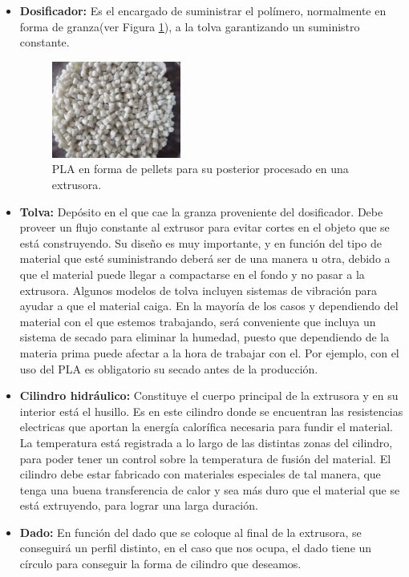 \begin{itemize}
    \item \textbf{Dosificador:} Es el encargado de suministrar el polímero, normalmente en forma de granza(ver Figura \ref{fig:Pellets_PLA}), a la tolva garantizando un suministro constante. 
     \begin{figure}[h!]
        \centering
        \includegraphics[width=0.4\textwidth]{images/PLA-Pellets.jpg}
        \caption[Pellets de PLA]{PLA en forma de pellets para su posterior procesado en una extrusora.}
        \label{fig:Pellets_PLA}
    \end{figure}
    \item \textbf{Tolva:} Depósito en el que cae la granza proveniente del dosificador. Debe proveer un flujo constante al extrusor para evitar cortes en el objeto que se está construyendo. Su diseño es muy importante, y en función del tipo de material que esté suministrando deberá ser de una manera u otra, debido a que el material puede llegar a compactarse en el fondo y no pasar a la extrusora. Algunos modelos de tolva incluyen sistemas de vibración para ayudar a que el material caiga. En la mayoría de los casos y dependiendo del material con el que estemos trabajando, será conveniente que incluya un sistema de secado para eliminar la humedad, puesto que dependiendo de la materia prima puede afectar a la hora de trabajar con el. Por ejemplo, con el uso del PLA es obligatorio su secado antes de la producción.
    \item \textbf{Cilindro hidráulico:} Constituye el cuerpo principal de la extrusora y en su interior está el husillo. Es en este cilindro donde se encuentran las resistencias electricas que aportan la energía calorífica necesaria para fundir el material. La temperatura está registrada a lo largo de las distintas zonas del cilindro, para poder tener un control sobre la temperatura de fusión del material. El cilindro debe estar fabricado con materiales especiales de tal manera, que tenga una buena transferencia de calor y sea más duro que el material que se está extruyendo, para lograr una larga duración.
    \item \textbf{Dado:} En función del dado que se coloque al final de la extrusora, se conseguirá un perfil distinto, en el caso que nos ocupa, el dado tiene un círculo para conseguir la forma de cilindro que deseamos.


\end{itemize}
